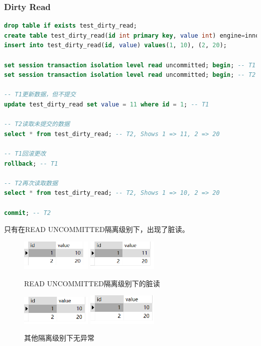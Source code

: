 \documentclass{article}
\begin{document}
\subsubsection{Dirty Read}

\begin{lstlisting}[language=sql]
drop table if exists test_dirty_read;
create table test_dirty_read(id int primary key, value int) engine=innodb;
insert into test_dirty_read(id, value) values(1, 10), (2, 20);

set session transaction isolation level read uncommitted; begin; -- T1
set session transaction isolation level read uncommitted; begin; -- T2

-- T1更新数据，但不提交
update test_dirty_read set value = 11 where id = 1; -- T1

-- T2读取未提交的数据
select * from test_dirty_read; -- T2, Shows 1 => 11, 2 => 20

-- T1回滚更改
rollback; -- T1

-- T2再次读取数据
select * from test_dirty_read; -- T2, Shows 1 => 10, 2 => 20

commit; -- T2
\end{lstlisting}

只有在READ UNCOMMITTED隔离级别下，出现了脏读。

\begin{figure}[H]
\centering
\includegraphics[width=0.3\textwidth]{img/48.png}
\includegraphics[width=0.3\textwidth]{img/49.png}
\caption{READ UNCOMMITTED隔离级别下的脏读}
\end{figure}

\begin{figure}[H]
\centering
\includegraphics[width=0.3\textwidth]{img/50.png}
\includegraphics[width=0.3\textwidth]{img/51.png}
\caption{其他隔离级别下无异常}
\end{figure}
\end{document}
